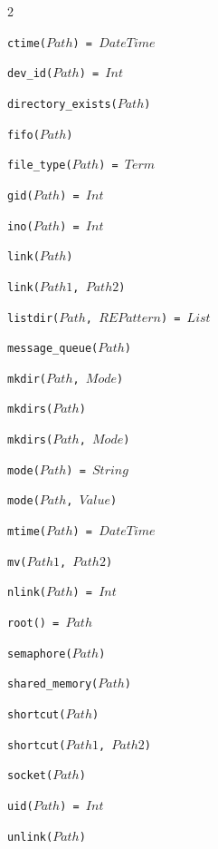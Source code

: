 \documentclass[10pt]{article}
\begin{document}
\begin{multicols}{2}
\begin{scriptsize}
\begin{itemize}
{\item \texttt{ctime($Path$) = $DateTime$}
\item \texttt{dev\_id($Path$) = $Int$}
\item \texttt{directory\_exists($Path$)}
\item \texttt{fifo($Path$)}
\item \texttt{file\_type($Path$) = $Term$}
\item \texttt{gid($Path$) = $Int$}
\item \texttt{ino($Path$) = $Int$}
\item \texttt{link($Path$)}
\item \texttt{link($Path1$, $Path2$)}
\item \texttt{listdir($Path$, $REPattern$) = $List$}
\item \texttt{message\_queue($Path$)}
\item \texttt{mkdir($Path$, $Mode$)}
\item \texttt{mkdirs($Path$)}
\item \texttt{mkdirs($Path$, $Mode$)}
\item \texttt{mode($Path$) = $String$}
\item \texttt{mode($Path$, $Value$)}
\item \texttt{mtime($Path$) = $DateTime$}
\item \texttt{mv($Path1$, $Path2$)}
\item \texttt{nlink($Path$) = $Int$}
\item \texttt{root() = $Path$}
\item \texttt{semaphore($Path$)}
\item \texttt{shared\_memory($Path$)}
\item \texttt{shortcut($Path$)}
\item \texttt{shortcut($Path1$, $Path2$)}
\item \texttt{socket($Path$)}
\item \texttt{uid($Path$) = $Int$}
\item \texttt{unlink($Path$)}
}
\end{itemize}
\end{scriptsize}

\end{multicols}
\end{document}
